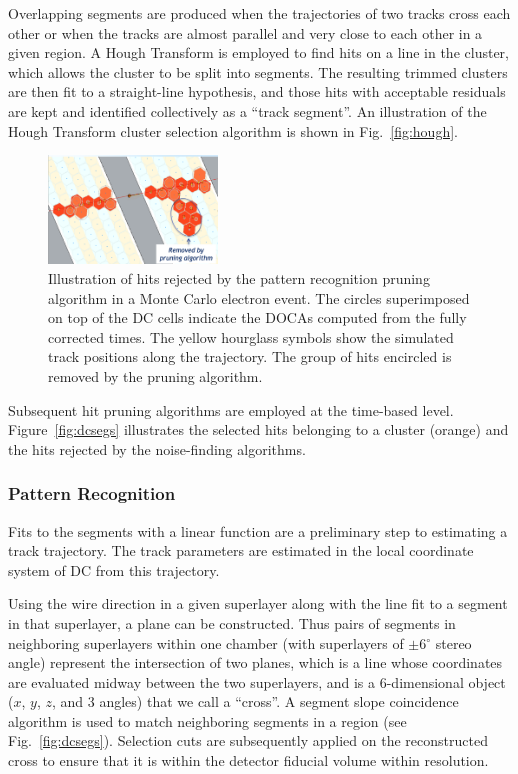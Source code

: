 Overlapping segments are produced when the trajectories of two tracks cross each other or when the tracks are
almost parallel and very close to each other in a given region. A Hough Transform is employed to find hits on a line
in the cluster, which allows the cluster to be split into segments.  The resulting trimmed clusters are then fit to a
straight-line hypothesis, and those hits with acceptable residuals are kept and identified collectively as a
``track segment''. An illustration of the Hough Transform cluster selection algorithm is shown in Fig.~\ref{fig:hough}.

\begin{figure}[t]
\centering
\includegraphics[width=0.4\textwidth]{pics/dcPattern2.png}
\caption{Illustration of hits rejected by the pattern recognition pruning algorithm in a Monte Carlo electron
  event. The circles superimposed on top of the DC cells indicate the DOCAs computed from the fully corrected
  times. The yellow hourglass symbols show the simulated track positions along the trajectory. The group of hits encircled is removed by the pruning algorithm.}
\label{fig:strings}
\end{figure}

Subsequent hit pruning algorithms are employed at the time-based level. Figure~\ref{fig:dcsegs} illustrates the
selected hits belonging to a cluster (orange) and the hits rejected by the noise-finding algorithms.

\subsubsection{Pattern Recognition}

Fits to the segments with a linear function are a preliminary step to estimating a track trajectory. The track
parameters are estimated in the local coordinate system of DC from this trajectory.

Using the wire direction in a given superlayer along with the line fit to a segment in that superlayer, a plane can
be constructed. Thus pairs of segments in neighboring superlayers within one chamber (with superlayers of
$\pm$6$^\circ$ stereo angle) represent the intersection of two planes, which is a line whose coordinates are
evaluated midway between the two superlayers, and is a 6-dimensional object ($x$, $y$, $z$, and 3 angles) that
we call a ``cross''. A segment slope coincidence algorithm is used to match neighboring segments in a region (see
Fig.~\ref{fig:dcsegs}).  Selection cuts are subsequently applied on the reconstructed cross to ensure that it is
within the detector fiducial volume within resolution.

